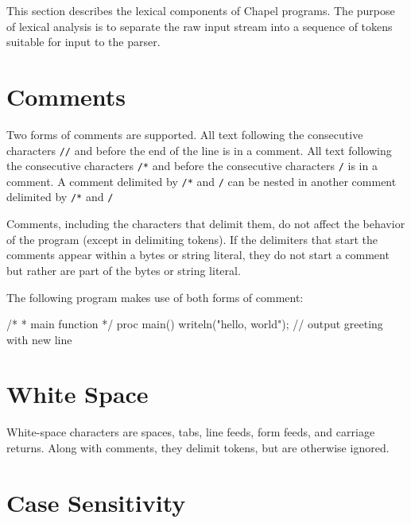 \label{Lexical_Structure}

This section describes the lexical components of Chapel programs.
The purpose of lexical analysis is
to separate the raw input stream into a sequence of tokens suitable
for input to the parser.

\section{Comments}
\label{Comments}

Two forms of comments are supported.  All text following the
consecutive characters {\tt //} and before the end of the line is in a
comment.  All text following the consecutive characters {\tt /*} and
before the consecutive characters {\tt */} is in a comment.
A comment delimited by {\tt /*} and {\tt */} can be nested in
another comment delimited by {\tt /*} and {\tt */}

Comments, including the characters that delimit them, do not affect
the behavior of the program (except in delimiting tokens).  If the
delimiters that start the comments appear within a bytes or string literal,
they do not start a comment but rather are part of the bytes or string literal.

\begin{example}
The following program makes use of both forms of comment:
\begin{chapel}
/*
 *  main function
 */
proc main() {
  writeln("hello, world"); // output greeting with new line
}
\end{chapel}
\end{example}

\section{White Space}
\label{White_Space}

White-space characters are spaces, tabs, line feeds, form feeds, and carriage
returns.  Along with comments, they delimit tokens, but are otherwise
ignored.

\section{Case Sensitivity}
\label{Case_Sensitivity}

